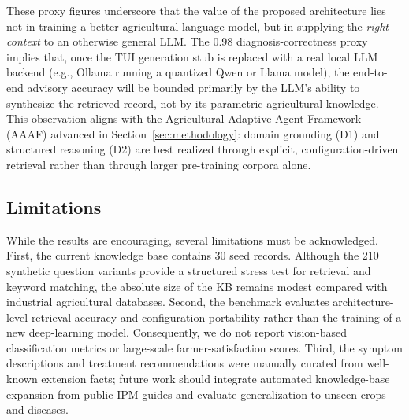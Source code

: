 These proxy figures underscore that the value of the proposed architecture lies not in training a better agricultural language model, but in supplying the \textit{right context} to an otherwise general LLM. The 0.98 diagnosis-correctness proxy implies that, once the TUI generation stub is replaced with a real local LLM backend (e.g., Ollama running a quantized Qwen or Llama model), the end-to-end advisory accuracy will be bounded primarily by the LLM's ability to synthesize the retrieved record, not by its parametric agricultural knowledge. This observation aligns with the Agricultural Adaptive Agent Framework (AAAF) advanced in Section~\ref{sec:methodology}: domain grounding (D1) and structured reasoning (D2) are best realized through explicit, configuration-driven retrieval rather than through larger pre-training corpora alone.

\subsection{Limitations}

While the results are encouraging, several limitations must be acknowledged. First, the current knowledge base contains 30 seed records. Although the 210 synthetic question variants provide a structured stress test for retrieval and keyword matching, the absolute size of the KB remains modest compared with industrial agricultural databases. Second, the benchmark evaluates architecture-level retrieval accuracy and configuration portability rather than the training of a new deep-learning model. Consequently, we do not report vision-based classification metrics or large-scale farmer-satisfaction scores. Third, the symptom descriptions and treatment recommendations were manually curated from well-known extension facts; future work should integrate automated knowledge-base expansion from public IPM guides and evaluate generalization to unseen crops and diseases.

